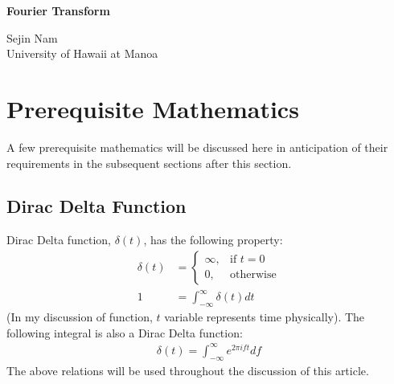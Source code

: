 \documentclass[letterpaper, 11pt]{article}
\newcommand{\fint}{\int_{-\infty}^{\infty}} %
\numberwithin{equation}{section}
\begin{document}
\begin{titlepage}
	\begin{center}
		\Huge{\bfseries Fourier Transform}\vfill 
	\end{center}

	\begin{flushright}
		Sejin Nam\\
		University of Hawaii at Manoa
	\end{flushright}
\end{titlepage}

\begin{comment} %
\title{Fourier Transform}
\author{Sejin Nam}
\date{May 20}
\maketitle
\thispagestyle{empty}
\clearpage
\end{comment}

\tableofcontents
\clearpage

\section{Prerequisite Mathematics}
A few prerequisite mathematics will be discussed here in anticipation of their requirements in the subsequent sections after this section. 

\subsection{Dirac Delta Function}
Dirac Delta function, \(\delta (t)\), has the following property:
\begin{align}
	\delta (t)	&=\begin{cases}
		\infty, & \text{if } t = 0 \\
		0,	& \text{otherwise}
	\end{cases}\\
		1	&= \fint \delta (t) dt
\end{align}
(In my discussion of function, \(t\) variable represents time physically). The following integral is also a Dirac Delta function:
\begin{align}
	\delta (t) = \fint e^{2\pi ift} df\label{eq:dirac}
\end{align}
The above relations will be used throughout the discussion of this article.
\end{document}
